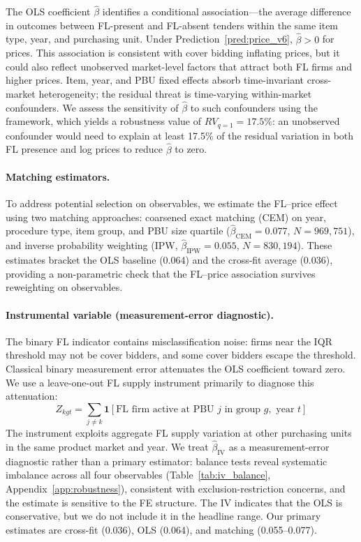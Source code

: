 The OLS coefficient $\hat{\beta}$ identifies a conditional
association---the average difference in outcomes between FL-present and
FL-absent tenders within the same item type, year, and purchasing unit.
Under Prediction~\ref{pred:price_v6}, $\hat{\beta} > 0$ for prices.
This association is consistent with cover bidding inflating prices, but
it could also reflect unobserved market-level factors that attract both
FL firms and higher prices. Item, year, and PBU fixed effects absorb
time-invariant cross-market heterogeneity; the residual threat is
time-varying within-market confounders. We assess the sensitivity of
$\hat{\beta}$ to such confounders using the \citet{cinelli2020making}
framework, which yields a robustness value of $RV_{q=1} = 17.5\%$: an
unobserved confounder would need to explain at least 17.5\% of the
residual variation in both FL presence and log prices to reduce
$\hat{\beta}$ to zero.

\paragraph{Matching estimators.}
To address potential selection on observables, we estimate the
FL--price effect using two matching approaches: coarsened exact
matching (CEM) on year, procedure type, item group, and PBU size
quartile ($\hat{\beta}_{\text{CEM}} = 0.077$, $N = 969{,}751$), and
inverse probability weighting (IPW, $\hat{\beta}_{\text{IPW}} = 0.055$,
$N = 830{,}194$). These estimates bracket the OLS baseline (0.064)
and the cross-fit average (0.036), providing a non-parametric check
that the FL--price association survives reweighting on observables.

\paragraph{Instrumental variable (measurement-error diagnostic).}
The binary FL indicator contains misclassification noise: firms near
the IQR threshold may not be cover bidders, and some cover bidders
escape the threshold. Classical binary measurement error attenuates
the OLS coefficient toward zero. We use a leave-one-out FL supply
instrument primarily to diagnose this attenuation:
\begin{equation}
  Z_{kgt} = \sum_{j \neq k} \mathbf{1}[\text{FL firm active at PBU } j
  \text{ in group } g, \text{ year } t]
  \label{eq:iv_v6}
\end{equation}
The instrument exploits aggregate FL supply variation at other
purchasing units in the same product market and year. We treat
$\hat{\beta}_{\text{IV}}$ as a measurement-error diagnostic rather
than a primary estimator: balance tests reveal systematic imbalance
across all four observables (Table~\ref{tab:iv_balance},
Appendix~\ref{app:robustness}), consistent with exclusion-restriction
concerns, and the estimate is sensitive to the FE structure. The IV
indicates that the OLS is conservative, but we do not include it in
the headline range. Our primary estimates are cross-fit (0.036),
OLS (0.064), and matching (0.055--0.077).

